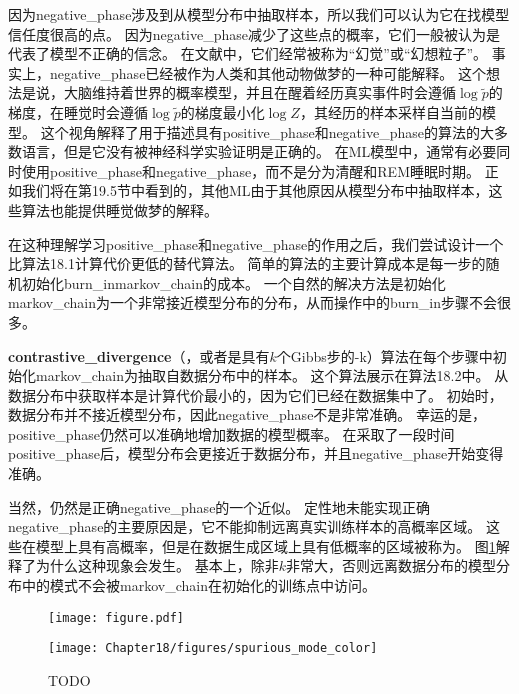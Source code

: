 因为\gls{negative_phase}涉及到从模型分布中抽取样本，所以我们可以认为它在找模型信任度很高的点。
因为\gls{negative_phase}减少了这些点的概率，它们一般被认为是代表了模型不正确的信念。
在文献中，它们经常被称为“幻觉”或“幻想粒子”。
事实上，\gls{negative_phase}已经被作为人类和其他动物做梦的一种可能解释\citep{CrickMitchison83}。
这个想法是说，大脑维持着世界的概率模型，并且在醒着经历真实事件时会遵循$\log \tilde{p}$的梯度，在睡觉时会遵循$\log \tilde{p}$的梯度最小化$\log Z$，其经历的样本采样自当前的模型。
这个视角解释了用于描述具有\gls{positive_phase}和\gls{negative_phase}的算法的大多数语言，但是它没有被神经科学实验证明是正确的。
在\gls{ML}模型中，通常有必要同时使用\gls{positive_phase}和\gls{negative_phase}，而不是分为清醒和REM睡眠时期。
正如我们将在第19.5节中看到的，其他\gls{ML}由于其他原因从模型分布中抽取样本，这些算法也能提供睡觉做梦的解释。


在这种理解学习\gls{positive_phase}和\gls{negative_phase}的作用之后，我们尝试设计一个比算法18.1计算代价更低的替代算法。
简单的算法的主要计算成本是每一步的随机初始化\gls{burn_in}\gls{markov_chain}的成本。
一个自然的解决方法是初始化\gls{markov_chain}为一个非常接近模型分布的分布，从而操作中的\gls{burn_in}步骤不会很多。


\textbf{\gls{contrastive_divergence}}（，或者是具有$k$个Gibbs步的-k）算法在每个步骤中初始化\gls{markov_chain}为抽取自数据分布中的样本\citep{Hinton-PoE-2000,Hinton-RBMguide-small}。
这个算法展示在算法18.2中。
从数据分布中获取样本是计算代价最小的，因为它们已经在数据集中了。
初始时，数据分布并不接近模型分布，因此\gls{negative_phase}不是非常准确。
幸运的是，\gls{positive_phase}仍然可以准确地增加数据的模型概率。
在采取了一段时间\gls{positive_phase}后，模型分布会更接近于数据分布，并且\gls{negative_phase}开始变得准确。


当然，仍然是正确\gls{negative_phase}的一个近似。
定性地未能实现正确\gls{negative_phase}的主要原因是，它不能抑制远离真实训练样本的高概率区域。
这些在模型上具有高概率，但是在数据生成区域上具有低概率的区域被称为。
图\ref{fig:chap18_spurious_mode}解释了为什么这种现象会发生。
基本上，除非$k$非常大，否则远离数据分布的模型分布中的模式不会被\gls{markov_chain}在初始化的训练点中访问。



\begin{figure}[!htb]
\ifOpenSource
\centerline{\texttt{[image: figure.pdf]}}
\else
\centerline{\texttt{[image: Chapter18/figures/spurious\_mode\_color]}}
\fi
\caption{TODO}
\label{fig:chap18_spurious_mode}
\end{figure}


